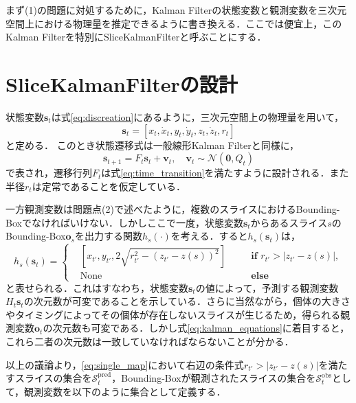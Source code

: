 まず(1)の問題に対処するために，Kalman Filterの状態変数と観測変数を三次元空間上における物理量を推定できるように書き換える．ここでは便宜上，このKalman Filterを特別にSliceKalmanFilterと呼ぶことにする．
    
\section{SliceKalmanFilterの設計}
状態変数$\bm{s}_t$は式\ref{eq:discreation}にあるように，三次元空間上の物理量を用いて，
\begin{equation}
    \label{eq:skf_state}
    \bm{s}_t = \left[x_t, \dot{x}_t, y_t, \dot{y}_t, z_t, \dot{z}_t, r_t\right]
\end{equation}
と定める．
このとき状態遷移式は一般線形Kalman Filterと同様に，
\begin{equation}
    \bm{s}_{t+1} = F_t \bm{s}_t + \bm{v}_t,\quad \bm{v}_t \sim \mathcal{N}(\bm{0}, Q_t)
\end{equation}
で表され，遷移行列$F_t$は式\ref{eq:time_transition}を満たすように設計される．また半径$r_t$は定常であることを仮定している．
\par
一方観測変数は問題点(2)で述べたように，複数のスライスにおけるBounding-Boxでなければいけない．しかしここで一度，状態変数$\bm{s}_t$からあるスライス$s$のBounding-Box$\bm{o}_s$を出力する関数$h_s(\cdot)$を考える．すると$h_s(\bm{s}_t)$は，
\begin{equation}
    \label{eq:single_map}
    h_s(\bm{s}_t) = \left\{
        \begin{aligned}
            &\left[x_{t'}, y_{t'}, 2\sqrt{r_{t'}^2 - \left(z_{t'} - z(s)\right)^2} \right]& &\quad \textbf{if }r_{t'} > \left| z_{t'} - z(s) \right|,
            \\ &\text{None}& &\quad \textbf{else }
        \end{aligned}
    \right.
\end{equation}
と表せられる．これはすなわち，状態変数$\bm{s}_t$の値によって，予測する観測変数$H_t \bm{s}_t$の次元数が可変であることを示している．さらに当然ながら，個体の大きさやタイミングによってその個体が存在しないスライスが生じるため，得られる観測変数$\bm{o}_t$の次元数も可変である．しかし式\ref{eq:kalman_equations}に着目すると，これら二者の次元数は一致していなければならないことが分かる．
\par
以上の議論より，\ref{eq:single_map}において右辺の条件式$r_{t'} > \left| z_{t'} - z(s) \right|$を満たすスライスの集合を$\mathcal{S}^{\text{pred}}_t$，Bounding-Boxが観測されたスライスの集合を$\mathcal{S}_t^{\text{obs}}$として，観測変数を以下のように集合として定義する．
